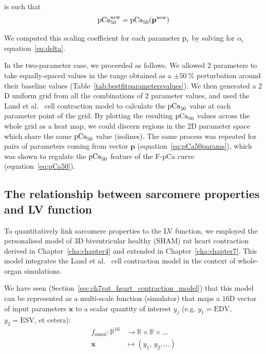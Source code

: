 \noindent
is such that
%
\begin{equation}
    \textrm{pCa}_{50}^{\text{new}} = \textrm{pCa}_{50}(\mathbf{p}^{\text{new}})
\end{equation}

\vspace{0.2cm}\noindent
We computed this scaling coefficient for each parameter $\textrm{p}_i$ by solving for $\alpha_i$ equation~\eqref{eq:delta}.

\vspace{0.2cm}
In the two-parameter case, we proceeded as follows. We allowed $2$ parameters to take equally-spaced values in the range obtained as a $\pm\SI{50}{\percent}$ perturbation around their baseline values (Table~\ref{tab:bestfitparametersvalues}). We then generated a $2$D uniform grid from all the combinations of $2$ parameter values, and used the Land et al.~\cite{Land:2012} cell contraction model to calculate the $\textrm{pCa}_{50}$ value at each parameter point of the grid. By plotting the resulting $\textrm{pCa}_{50}$ values across the whole grid as a heat map, we could discern regions in the $2$D parameter space which share the same $\textrm{pCa}_{50}$ value (isolines). The same process was repeated for pairs of parameters coming from vector $\mathbf{p}$ (equation~\eqref{eq:pCa50params}), which was shown to regulate the $\textrm{pCa}_{50}$ feature of the F-pCa curve (equation~\eqref{eq:pCa50}).


%
%
%
\subsection{The relationship between sarcomere properties and LV function}\label{subsec:quantlink}
To quantitatively link sarcomere properties to the LV function, we employed the personalised model of $3$D biventricular healthy (SHAM) rat heart contraction derived in Chapter~\ref{cha:chapter4} and extended in Chapter~\ref{cha:chapter7}. This model integrates the Land et al.~\cite{Land:2012} cell contraction model in the context of whole-organ simulations.

\vspace{0.2cm}
We have seen (Section~\ref{sec:ch7rat_heart_contraction_model}) that this model can be represented as a multi-scale function (simulator) that maps a $16$D vector of input parameters $\mathbf{x}$ to a scalar quantity of interest $y_j$ (e.g. $y_1=\textrm{EDV}$, $y_2=\textrm{ESV}$, et cetera):
%
\begin{align}\label{eq:fsimul}
    f_{\textrm{simul}}\colon\mathbb{R}^{16} &\to\mathbb{R}\times\mathbb{R}\times\dots \\
    \mathbf{x} &\mapsto (y_1,\,y_2,\dots) \nonumber
\end{align}

